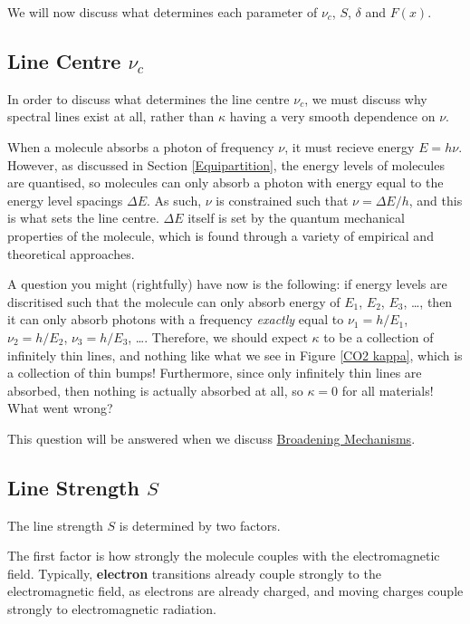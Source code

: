 We will now discuss what determines each parameter of $\nu_c$, $S$, $\delta$ and $F(x)$.

\subsection{Line Centre\texorpdfstring{ $\nu_c$}{}}

In order to discuss what determines the line centre $\nu_c$, we must discuss why spectral lines exist at all, rather than $\kappa$ having a very smooth dependence on $\nu$.

When a molecule absorbs a photon of frequency $\nu$, it must recieve energy $E=h\nu$. However, as discussed in Section \ref{Equipartition}, the energy levels of molecules are quantised, so molecules can only absorb a photon with energy equal to the energy level spacings $\Delta E$. As such, $\nu$ is constrained such that $\nu=\Delta E/h$, and this is what sets the line centre. $\Delta E$ itself is set by the quantum mechanical properties of the molecule, which is found through a variety of empirical and theoretical approaches.

A question you might (rightfully) have now is the following: if energy levels are discritised such that the molecule can only absorb energy of $E_1$, $E_2$, $E_3$, \ldots, then it can only absorb photons with a frequency \textit{exactly} equal to $\nu_1=h/E_1$, $\nu_2=h/E_2$, $\nu_3=h/E_3$, \ldots. Therefore, we should expect $\kappa$ to be a collection of infinitely thin lines, and nothing like what we see in Figure \ref{CO2 kappa}, which is a collection of thin bumps! Furthermore, since only infinitely thin lines are absorbed, then nothing is actually absorbed at all, so $\kappa=0$ for all materials! What went wrong?

This question will be answered when we discuss \hyperref[Broadening]{Broadening Mechanisms}.

\subsection{Line Strength\texorpdfstring{ $S$}{}}\label{Line Strength}

The line strength $S$ is determined by two factors.

The first factor is how strongly the molecule couples with the electromagnetic field. Typically, \textbf{electron} transitions already couple strongly to the electromagnetic field, as electrons are already charged, and moving charges couple strongly to electromagnetic radiation.

